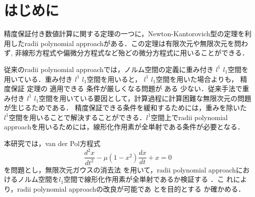 \documentclass[a4paper,10pt,twocolumn]{jsarticle}
\title{\vspace{-8mm}{\Large \gtfamily\mdseries\upshape 無限次元ガウスの消去法を用いた \rad{}改良 }\vspace{-3mm}}
\date{}
\author{（指導教員 関根 晃太 准教授） \\ 関根研究室 2131701 齋藤 悠希
\vspace{-5mm}}
\newcommand{\rad}{radii polynomial approach}
\newcommand{\nk}{Newton-Kantorovich}
\newcommand{\vdp}{van der Pol方程式}
\providecommand{\DIFaddtex}[1]{{\protect\color{blue} \sf #1}} %
\providecommand{\DIFdeltex}[1]{{\protect\color{red} \scriptsize #1}} %
\providecommand{\DIFaddbegin}{} %
\providecommand{\DIFaddend}{} %
\providecommand{\DIFdelbegin}{} %
\providecommand{\DIFdelend}{} %
\providecommand{\DIFadd}[1]{\texorpdfstring{\DIFaddtex{#1}}{#1}} %
\providecommand{\DIFdel}[1]{\texorpdfstring{\DIFdeltex{#1}}{}} %
\newcommand{\DIFscaledelfig}{0.5}
\newlength{\DIFdelgraphicswidth} %
\newlength{\DIFdelgraphicsheight} %
\newcommand{\DIFaddincludegraphics}[2][]{{\color{blue}\fbox{\DIFOincludegraphics[#1]{#2}}}} %
\newcommand{\DIFdelincludegraphics}[2][]{%
\sbox{\DIFdelgraphicsbox}{\DIFOincludegraphics[#1]{#2}}%
\settoboxwidth{\DIFdelgraphicswidth}{\DIFdelgraphicsbox} %
\settoboxtotalheight{\DIFdelgraphicsheight}{\DIFdelgraphicsbox} %
\scalebox{\DIFscaledelfig}{%
\parbox[b]{\DIFdelgraphicswidth}{\usebox{\DIFdelgraphicsbox}\\[-\baselineskip] \rule{\DIFdelgraphicswidth}{0em}}\llap{\resizebox{\DIFdelgraphicswidth}{\DIFdelgraphicsheight}{%
\setlength{\unitlength}{\DIFdelgraphicswidth}%
\begin{picture}(1,1)%
\thicklines\linethickness{2pt} %
{\color[rgb]{1,0,0}\put(0,0){\framebox(1,1){}}}%
{\color[rgb]{1,0,0}\put(0,0){\line( 1,1){1}}}%
{\color[rgb]{1,0,0}\put(0,1){\line(1,-1){1}}}%
\end{picture}%
}\hspace*{3pt}}} %
} %
\DeclareRobustCommand{\DIFaddbegin}{\DIFOaddbegin \let\includegraphics\DIFaddincludegraphics} %
\DeclareRobustCommand{\DIFaddend}{\DIFOaddend \let\includegraphics\DIFOincludegraphics} %
\DeclareRobustCommand{\DIFdelbegin}{\DIFOdelbegin \let\includegraphics\DIFdelincludegraphics} %
\DeclareRobustCommand{\DIFdelend}{\DIFOaddend \let\includegraphics\DIFOincludegraphics} %
\begin{document}
\maketitle
\vspace{-10mm}



\section{はじめに}
\vspace{-1mm}
精度保証付き数値計算に関する定理の一つに，\nk{}型の定理を利用した\rad{}がある．この定理は有限次元や無限次元を問わず, 非線形方程式や偏微分方程式など殆どの微分方程式に用いることができる．

従来の\rad{}では，ノルム空間の定義に重み付き\DIFdelbegin \DIFdel{$l^1$}\DIFdelend \DIFaddbegin \DIFadd{$l_1$}\DIFaddend 空間を用いている．重み付き\DIFdelbegin \DIFdel{$l^1$}\DIFdelend \DIFaddbegin \DIFadd{$l_1$}\DIFaddend 空間を用いると，\DIFdelbegin \DIFdel{$l^1$}\DIFdelend \DIFaddbegin \DIFadd{$l_1$}\DIFaddend 空間を用いた場合よりも，\DIFdelbegin \DIFdel{精度保証}\DIFdelend \DIFaddbegin \DIFadd{定理}\DIFaddend の\DIFaddbegin \DIFadd{適用}\DIFaddend できる\DIFdelbegin \DIFdel{条件が厳しくなる}\DIFdelend 問題が\DIFdelbegin \DIFdel{ある}\DIFdelend \DIFaddbegin \DIFadd{少ない}\DIFaddend ．従来手法で重み付き\DIFdelbegin \DIFdel{$l^1$}\DIFdelend \DIFaddbegin \DIFadd{$l_1$}\DIFaddend 空間を用いている要因として，計算過程に計算困難な無限次元の問題が生じるためである．
\DIFdelbegin \DIFdel{精度保証できる条件を緩和するためには，重みを除いた$l^1$空間を用いることで解決することができる．$l^1$空間上で\rad{}を用いるためには，線形化作用素が全単射である条件が必要となる．
}\DIFdelend 

本研究では，\vdp{}
\begin{equation}
  \frac{d^2x}{dt^2} - \mu (1-x^2)\frac{dx}{dt}+x=0
\end{equation}
を問題とし，無限次元ガウスの消去法\DIFdelbegin \DIFdel{\cite{r1}}\DIFdelend を用いて，\rad{}におけるノルム空間を$l_1$空間で線形化作用素が全単射であるか検証する\DIFdelbegin \DIFdel{．}\DIFdelend こ\DIFdelbegin \DIFdel{れにより，\rad{}の改良が可能であ}\DIFdelend \DIFaddbegin \DIFadd{とを目的とす}\DIFaddend る\DIFdelbegin \DIFdel{か確かめる}\DIFdelend ．



\vspace{-1mm}
\end{document}
